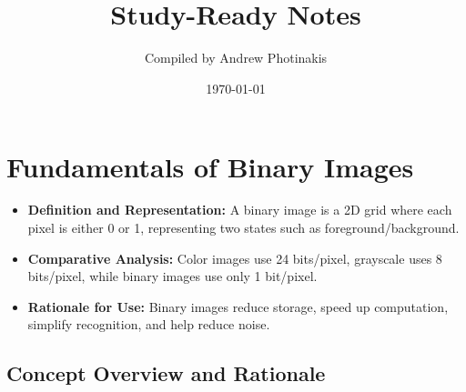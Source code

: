 \documentclass[12pt]{article}
\title{\TOPICTITLE\\\large Study-Ready Notes}
\author{Compiled by Andrew Photinakis}
\date{\today}
\begin{document}
\maketitle
\tableofcontents
\newpage


\section{Fundamentals of Binary Images}
\begin{itemize}
    \item \textbf{Definition and Representation:} A binary image is a 2D grid where each pixel is either 0 or 1, representing two states such as foreground/background.
    \item \textbf{Comparative Analysis:} Color images use 24 bits/pixel, grayscale uses 8 bits/pixel, while binary images use only 1 bit/pixel.
    \item \textbf{Rationale for Use:} Binary images reduce storage, speed up computation, simplify recognition, and help reduce noise.
\end{itemize}

\subsection{Concept Overview and Rationale}
\end{document}
